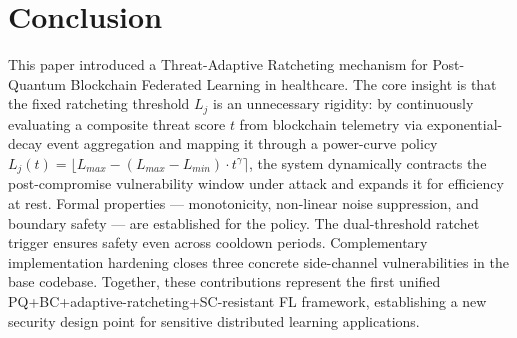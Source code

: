 \documentclass[journal, 10pt, twocolumn]{IEEEtran}
\begin{document}
\section{Conclusion}
This paper introduced a Threat-Adaptive Ratcheting mechanism for Post-Quantum Blockchain Federated Learning in healthcare. The core insight is that the fixed ratcheting threshold $L_j$ is an unnecessary rigidity: by continuously evaluating a composite threat score $t$ from blockchain telemetry via exponential-decay event aggregation and mapping it through a power-curve policy $L_j(t) = \lfloor L_{max} - (L_{max} - L_{min}) \cdot t^\gamma \rceil$, the system dynamically contracts the post-compromise vulnerability window under attack and expands it for efficiency at rest. Formal properties --- monotonicity, non-linear noise suppression, and boundary safety --- are established for the policy. The dual-threshold ratchet trigger ensures safety even across cooldown periods. Complementary implementation hardening closes three concrete side-channel vulnerabilities in the base codebase. Together, these contributions represent the first unified PQ+BC+adaptive-ratcheting+SC-resistant FL framework, establishing a new security design point for sensitive distributed learning applications.
\end{document}
